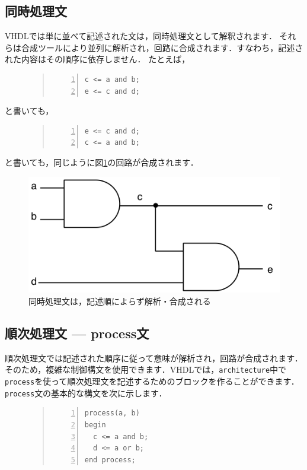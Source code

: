 \documentclass[a4paper,dvipdfmx]{jsarticle}
\begin{document}
\subsection{同時処理文}
VHDLでは単に並べて記述された文は，同時処理文として解釈されます．
それらは合成ツールにより並列に解析され，回路に合成されます．すなわち，記述された内容はその順序に依存しません．
たとえば，
\begin{figure}[H]
\begin{quote}
\begin{Verbatim}[frame=single, numbers=left, baselinestretch=0.8]
c <= a and b;
e <= c and d;
\end{Verbatim}
\end{quote}
\end{figure}
と書いても，
\begin{figure}[H]
\begin{quote}
\begin{Verbatim}[frame=single, numbers=left, baselinestretch=0.8]
e <= c and d;
c <= a and b;
\end{Verbatim}
\end{quote}
\end{figure}
と書いても，同じように図\ref{fig:parallel_vhdl}の回路が合成されます．

 \begin{figure}[H]
  \begin{center}
   \includegraphics[width=.4\textwidth]{chapter02_figures/parallel_vhdl.png}
  \end{center}
  \caption{同時処理文は，記述順によらず解析・合成される \label{fig:parallel_vhdl}}
 \end{figure}


\subsection{順次処理文 --- process文}
順次処理文では記述された順序に従って意味が解析され，回路が合成されます．そのため，複雑な制御構文を使用できます．VHDLでは，\verb|architecture|中で\verb|process|を使って順次処理文を記述するためのブロックを作ることができます．\verb|process|文の基本的な構文を次に示します．
\begin{figure}[H]
\begin{quote}
\begin{Verbatim}[frame=single, numbers=left, baselinestretch=0.8]
process(a, b)
begin
  c <= a and b;
  d <= a or b;
end process;
\end{Verbatim}
\end{quote}
\end{figure}
\end{document}
